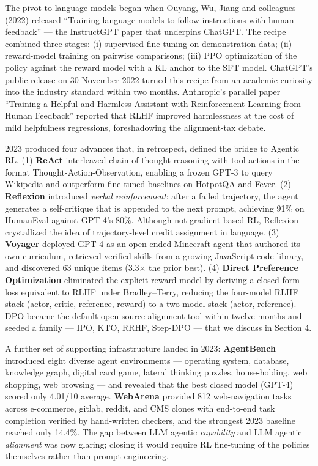 \documentclass{article}
\begin{document}
The pivot to language models began when Ouyang, Wu, Jiang and colleagues (2022) released ``Training language models to follow instructions with human feedback'' --- the InstructGPT paper that underpins ChatGPT. The recipe combined three stages: (i) supervised fine-tuning on demonstration data; (ii) reward-model training on pairwise comparisons; (iii) PPO optimization of the policy against the reward model with a KL anchor to the SFT model. ChatGPT's public release on 30 November 2022 turned this recipe from an academic curiosity into the industry standard within two months. Anthropic's parallel paper ``Training a Helpful and Harmless Assistant with Reinforcement Learning from Human Feedback'' \citep{bai20222022} reported that RLHF improved harmlessness at the cost of mild helpfulness regressions, foreshadowing the alignment-tax debate.

2023 produced four advances that, in retrospect, defined the bridge to Agentic RL. (1) \textbf{ReAct} \citep{yao20232023} interleaved chain-of-thought reasoning with tool actions in the format Thought-Action-Observation, enabling a frozen GPT-3 to query Wikipedia and outperform fine-tuned baselines on HotpotQA and Fever. (2) \textbf{Reflexion} \citep{shinn20232023} introduced \emph{verbal reinforcement}: after a failed trajectory, the agent generates a self-critique that is appended to the next prompt, achieving 91\% on HumanEval against GPT-4's 80\%. Although not gradient-based RL, Reflexion crystallized the idea of trajectory-level credit assignment in language. (3) \textbf{Voyager} \citep{wang20232023} deployed GPT-4 as an open-ended Minecraft agent that authored its own curriculum, retrieved verified skills from a growing JavaScript code library, and discovered 63 unique items (3.3× the prior best). (4) \textbf{Direct Preference Optimization} \citep{rafailov20232023} eliminated the explicit reward model by deriving a closed-form loss equivalent to RLHF under Bradley--Terry, reducing the four-model RLHF stack (actor, critic, reference, reward) to a two-model stack (actor, reference). DPO became the default open-source alignment tool within twelve months and seeded a family --- IPO, KTO, RRHF, Step-DPO --- that we discuss in Section 4.

A further set of supporting infrastructure landed in 2023: \textbf{AgentBench} \citep{liu20232023} introduced eight diverse agent environments --- operating system, database, knowledge graph, digital card game, lateral thinking puzzles, house-holding, web shopping, web browsing --- and revealed that the best closed model (GPT-4) scored only 4.01/10 average. \textbf{WebArena} \citep{zhou20232023} provided 812 web-navigation tasks across e-commerce, gitlab, reddit, and CMS clones with end-to-end task completion verified by hand-written checkers, and the strongest 2023 baseline reached only 14.4\%. The gap between LLM agentic \emph{capability} and LLM agentic \emph{alignment} was now glaring; closing it would require RL fine-tuning of the policies themselves rather than prompt engineering.
\end{document}
